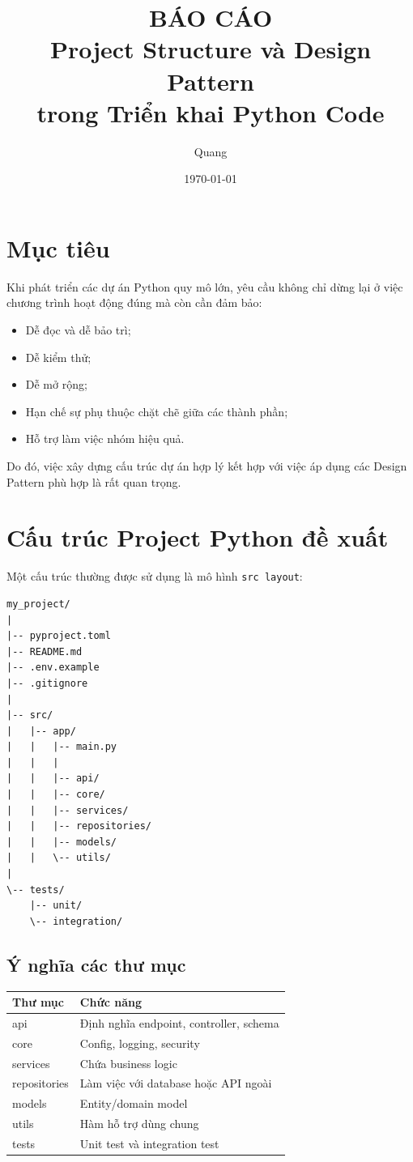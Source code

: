 \documentclass[12pt,a4paper]{article}
\title{
BÁO CÁO\\
Project Structure và Design Pattern\\
trong Triển khai Python Code
}
\author{Quang}
\date{\today}
\begin{document}
\maketitle

\section{Mục tiêu}

Khi phát triển các dự án Python quy mô lớn, yêu cầu không chỉ dừng lại ở việc chương trình hoạt động đúng mà còn cần đảm bảo:

\begin{itemize}
    \item Dễ đọc và dễ bảo trì;
    \item Dễ kiểm thử;
    \item Dễ mở rộng;
    \item Hạn chế sự phụ thuộc chặt chẽ giữa các thành phần;
    \item Hỗ trợ làm việc nhóm hiệu quả.
\end{itemize}

Do đó, việc xây dựng cấu trúc dự án hợp lý kết hợp với việc áp dụng các Design Pattern phù hợp là rất quan trọng.

\section{Cấu trúc Project Python đề xuất}

Một cấu trúc thường được sử dụng là mô hình \texttt{src layout}:

\begin{lstlisting}
my_project/
|
|-- pyproject.toml
|-- README.md
|-- .env.example
|-- .gitignore
|
|-- src/
|   |-- app/
|   |   |-- main.py
|   |   |
|   |   |-- api/
|   |   |-- core/
|   |   |-- services/
|   |   |-- repositories/
|   |   |-- models/
|   |   \-- utils/
|
\-- tests/
    |-- unit/
    \-- integration/
\end{lstlisting}

\subsection{Ý nghĩa các thư mục}

\begin{longtable}{p{4cm}p{9cm}}
\toprule
Thư mục & Chức năng \\
\midrule
api & Định nghĩa endpoint, controller, schema \\
core & Config, logging, security \\
services & Chứa business logic \\
repositories & Làm việc với database hoặc API ngoài \\
models & Entity/domain model \\
utils & Hàm hỗ trợ dùng chung \\
tests & Unit test và integration test \\
\bottomrule
\end{longtable}
\end{document}
